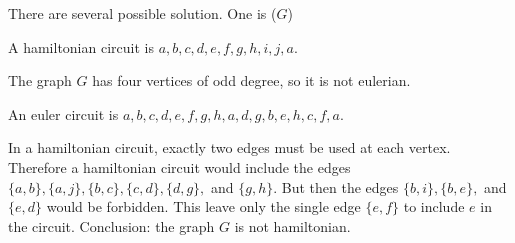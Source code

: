     
\begin{Solution}{38.3}
There are several possible solution. One is
\vspace*{2\baselineskip}
($G$)\quad\linebreak{}
\end{Solution}

    
\begin{Solution}{38.4}
A hamiltonian circuit is $a,b,c,d,e,f,g,h,i,j,a$.

The graph $G$ has four vertices of odd degree, so it is not eulerian.

\end{Solution}

    
\begin{Solution}{38.5}

An euler circuit is $a,b,c,d,e,f,g,h,a,d,g,b,e,h,c,f,a$.

\end{Solution}

    
\begin{Solution}{38.6}

In a hamiltonian circuit, exactly two edges must be used at each vertex. Therefore a hamiltonian circuit would include the edges $\{a,b\}, \{a,j\}, \{b,c\}, \{c,d\}, \{d,g\},$ and $\{g,h\}$. But then the edges $\{b,i\}, \{b,e\},$ and
$\{e,d\}$ would be forbidden. This leave only the single edge $\{e,f\}$ to include $e$ in the circuit. Conclusion: the graph  $G$ is not hamiltonian. 

\end{Solution}

